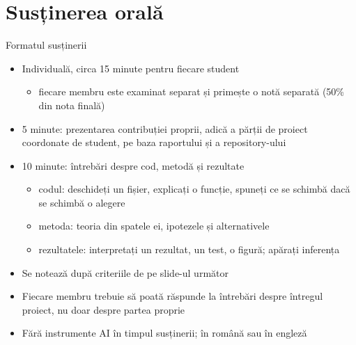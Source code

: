 \section{Susținerea orală}

\begin{frame}{Formatul susținerii}
\itemsize{\small}
\begin{itemize}
    \item Individuală, circa 15 minute pentru fiecare student
    \begin{itemize}
        \item fiecare membru este examinat separat și primește o notă separată (50\% din nota finală)
    \end{itemize}
    \item 5 minute: prezentarea contribuției proprii, adică a părții de proiect coordonate de student, pe baza raportului și a repository-ului
    \item 10 minute: întrebări despre cod, metodă și rezultate
    \begin{itemize}
        \item codul: deschideți un fișier, explicați o funcție, spuneți ce se schimbă dacă se schimbă o alegere
        \item metoda: teoria din spatele ei, ipotezele și alternativele
        \item rezultatele: interpretați un rezultat, un test, o figură; apărați inferența
    \end{itemize}
    \item Se notează după criteriile de pe slide-ul următor
    \item Fiecare membru trebuie să poată răspunde la întrebări despre întregul proiect, nu doar despre partea proprie
    \item Fără instrumente AI în timpul susținerii; în română sau în engleză
\end{itemize}
\end{frame}

